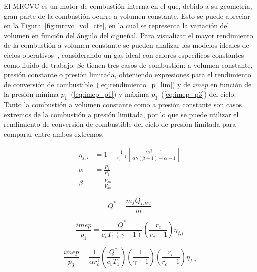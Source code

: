 El MRCVC es un motor de combustión interna en el que, debido a su geometría,
gran parte de la combustión ocurre a volumen constante.
%
Esto se puede apreciar en la Figura~\ref{fig:mrcvc_vol_cte}, en la cual se
representa la variación del volumen en función del ángulo del cigüeñal.
%
Para visualizar el mayor rendimiento de la combustión a volumen constante  se
pueden analizar los modelos ideales de ciclos operativos~\parencite{heywood},
considerando un gas ideal con calores específicos constantes como fluido de
trabajo.
%
Se tienen tres casos de combustión: a volumen constante, presión constante o presión
limitada, obteniendo expresiones para el rendimiento de conversión de
combustible~(\ref{eq:rendimiento_p_lim}) y de $imep$ en función de la presión
mínima $p_1$~(\ref{eq:imep_p1}) y máxima $p_3$~(\ref{eq:imep_p3}) del ciclo.
%
Tanto la combustión a volumen constante como a presión constante son casos
extremos de la combustión a presión limitada, por lo que se puede utilizar el
rendimiento de conversión de combustible del ciclo de presión limitada para
comparar entre ambos extremos.


\begin{align}
    \label{eq:rendimiento_p_lim}
  \eta_{f,i} &= 1 - \frac{1}{r_c^{\gamma - 1}} \left[ \frac{\alpha \beta^\gamma-1}{\alpha \gamma (\beta-1)+\alpha-1} \right]\\
  \alpha &= \frac{P_3}{P_2}\\ \beta &= \frac{V_{3b}}{V_{3a}}
\end{align}


\begin{equation}
    \label{eq:Q*} Q^{*}=  \frac{m_{f}Q_{LHV}}{m}
\end{equation}



\begin{equation}
    \label{eq:imep_p1} \frac{imep}{p_1} = \frac{Q^*}{c_v T_1 (\gamma-1)} \left( \frac{r_c}{r_c-1} \right) \eta_{f,i}
\end{equation}

\begin{equation}
    \label{eq:imep_p3} \frac{imep}{p_3} = \frac{1}{\alpha r_c^\gamma} \left( \frac{Q^*}{c_v T_1} \right) \left(\frac{1}{\gamma-1} \right) \left( \frac{r_c}{r_c-1} \right) \eta_{f,i}
\end{equation}

